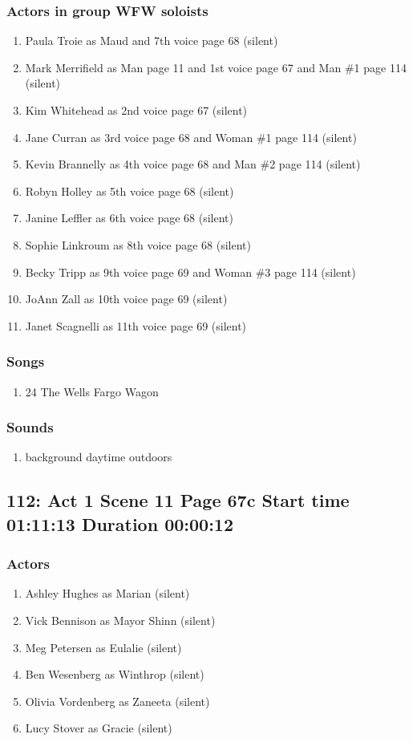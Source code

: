 \subsubsection{Actors in group WFW soloists}
\begin{enumerate}
\item Paula Troie as Maud and 7th voice page 68 (silent)
\item Mark Merrifield as Man page 11 and 1st voice page 67 and Man \#1 page 114 (silent)
\item Kim Whitehead as 2nd voice page 67 (silent)
\item Jane Curran as 3rd voice page 68 and Woman \#1 page 114 (silent)
\item Kevin Brannelly as 4th voice page 68 and Man \#2 page 114 (silent)
\item Robyn Holley as 5th voice page 68 (silent)
\item Janine Leffler as 6th voice page 68 (silent)
\item Sophie Linkroum as 8th voice page 68 (silent)
\item Becky Tripp as 9th voice page 69 and Woman \#3 page 114 (silent)
\item JoAnn Zall as 10th voice page 69 (silent)
\item Janet Scagnelli as 11th voice page 69 (silent)
\end{enumerate}

\subsubsection{Songs}
\begin{enumerate}
\item 24 The Wells Fargo Wagon
\end{enumerate}\subsubsection{Sounds}
\begin{enumerate}
\item background daytime outdoors
\end{enumerate}
\subsection{112: Act 1 Scene 11 Page 67c Start time 01:11:13 Duration 00:00:12}

\subsubsection{Actors}
\begin{enumerate}
\item Ashley Hughes as Marian (silent)
\item Vick Bennison as Mayor Shinn (silent)
\item Meg Petersen as Eulalie (silent)
\item Ben Wesenberg as Winthrop (silent)
\item Olivia Vordenberg as Zaneeta (silent)
\item Lucy Stover as Gracie (silent)
\end{enumerate}
